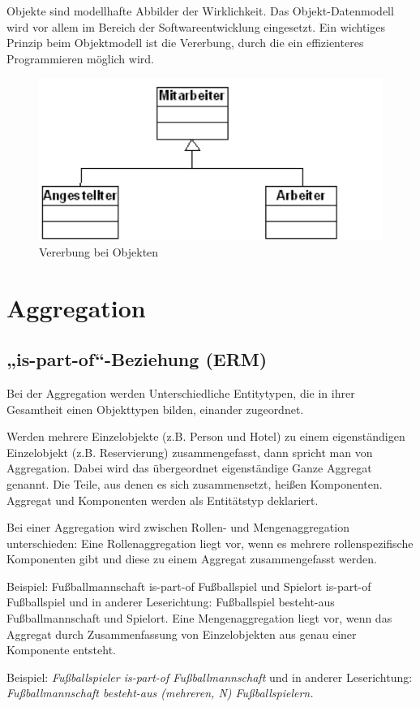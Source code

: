 Objekte sind modellhafte Abbilder der Wirklichkeit. Das Objekt-Datenmodell wird vor allem im Bereich der Softwareentwicklung eingesetzt. Ein wichtiges Prinzip beim Objektmodell ist die Vererbung, durch die ein effizienteres Programmieren möglich wird.

\begin{figure}[H]
    \centering
    \includegraphics[width=.4\textwidth]{Content/images/modellierung/objekt.png}
    \caption{Vererbung bei Objekten}
    \label{fig:modellierung:objekt}
\end{figure}

\section{Aggregation}

\subsection{„is-part-of“-Beziehung (ERM)}

Bei der Aggregation werden Unterschiedliche Entitytypen, die in ihrer Gesamtheit einen Objekttypen bilden, einander zugeordnet.

Werden mehrere Einzelobjekte (z.B. Person und Hotel) zu einem eigenständigen Einzelobjekt (z.B. Reservierung) zusammengefasst, dann spricht man von Aggregation. Dabei wird das übergeordnet eigenständige Ganze Aggregat genannt. Die Teile, aus denen es sich zusammensetzt, heißen Komponenten. Aggregat und Komponenten werden als Entitätstyp deklariert.

Bei einer Aggregation wird zwischen Rollen- und Mengenaggregation unterschieden:
Eine Rollenaggregation liegt vor, wenn es mehrere rollenspezifische Komponenten gibt und diese zu einem Aggregat zusammengefasst werden.

Beispiel: 
Fußballmannschaft is-part-of Fußballspiel und Spielort is-part-of Fußballspiel
 	und in anderer Leserichtung:
Fußballspiel besteht-aus Fußballmannschaft und Spielort.
Eine Mengenaggregation liegt vor, wenn das Aggregat durch Zusammenfassung von Einzelobjekten aus genau einer Komponente entsteht.

Beispiel:
\textit{Fußballspieler is-part-of Fußballmannschaft} \newline
 	und in anderer Leserichtung: \newline
\textit{Fußballmannschaft besteht-aus (mehreren, N) Fußballspielern.}


